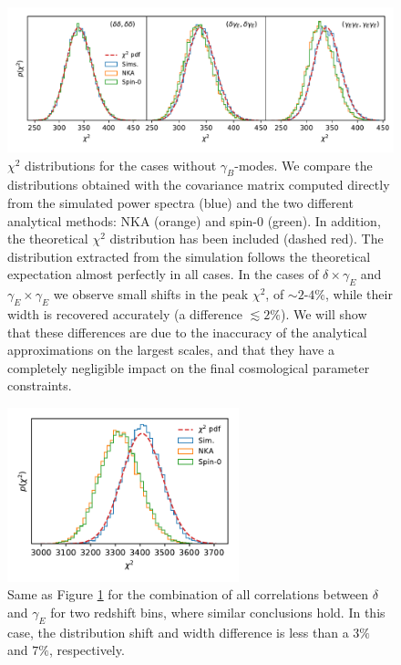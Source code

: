 \documentclass[a4paper,11pt]{article}
\begin{document}
      \begin{figure}
        \centering
        \includegraphics[width=\textwidth]{./figures/run_sph_2b_1stbin_chi2_TT_TE_EE.pdf}
        \caption{$\chi^2$ distributions for the cases without
          $\gamma_B$-modes. We compare the distributions obtained with the
          covariance matrix computed directly from the simulated power spectra
          (blue) and the two different analytical methods: NKA (orange) and
          spin-0 (green). In addition, the theoretical $\chi^2$ distribution
          has been included (dashed red). The distribution extracted from the
          simulation follows the theoretical expectation almost perfectly in
          all cases. In the cases of $\delta\times\gamma_E$ and
          $\gamma_E\times\gamma_E$ we observe small shifts in the peak
          $\chi^2$, of $\sim2$-$4\%$, while their width is recovered
          accurately (a difference $\lesssim 2\%$). We will show that these
          differences are due to the inaccuracy of the analytical
          approximations on the largest scales, and that they have a
          completely negligible impact on the final cosmological parameter
          constraints.} 
        \label{fig:chi2_1bin}
      \end{figure}
      \begin{figure}
        \centering
        \includegraphics[width=0.6\textwidth]{./figures/run_sph_2b_Spin0_NKA_TTTEEE_Full_chi2.pdf}
        \caption{Same as Figure \ref{fig:chi2_1bin} for the combination of all
          correlations between $\delta$ and $\gamma_E$ for two redshift bins,
          where similar conclusions hold. In this case, the distribution
          shift and width difference is less than a $3\%$ and $7\%$,
          respectively.}
        \label{fig:chi2_2bins}
      \end{figure}
\end{document}
